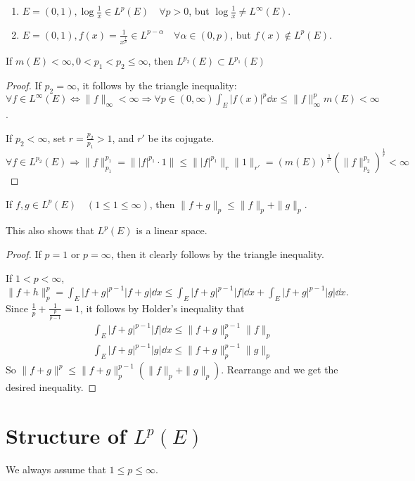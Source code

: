 \documentclass{article}
\begin{document}
\begin{Eg}
\begin{enumerate}
\item$E=(0,1), \log{\frac 1 x}\in L^p(E)\quad \forall p>0$, but $\log{\frac 1 x}\neq L^\infty(E)$.
\item$E=(0,1), f(x)=\frac{1}{x^{\frac 1 p}}\in L^{p-\alpha}\quad\forall\alpha\in (0,p)$, but $f(x)\not\in L^p(E)$.
\end{enumerate}
\end{Eg}

\begin{Prop}
If $m(E)<\infty,0<p_1<p_2\leq\infty$, then $L^{p_2}(E)\subset L^{p_1}(E)$
\end{Prop}

\begin{proof}
If $p_2=\infty$, it follows by the triangle inequality: $\forall f\in L^\infty(E)\Leftrightarrow \|f\|_\infty<\infty\Rightarrow \forall p\in(0,\infty)\int_E|f(x)|^p\dd x\leq \|f\|^p_\infty m(E)<\infty$.

If $p_2<\infty$, set $r=\frac{p_2}{p_1}>1$, and $r'$ be its cojugate. $\forall f\in L^{p_2}(E)\Rightarrow\|f\|_{p_1}^{p_1}=\||f|^{p_1}\cdot 1\|\leq \||f|^{p_1}\|_r\|1\|_{r'}=(m(E))^{\frac 1 {r'}}(\|f\|_{p_2}^{p_2})^{\frac 1 r}<\infty$
\end{proof}

\begin{Thm}
If $f,g\in L^p(E)\quad(1\leq 1\leq \infty)$, then $\|f+g\|_p\leq \|f\|_p+\|g\|_p$.
\end{Thm}

This also shows that $L^p(E)$ is a linear space.

\begin{proof}
If $p=1$ or $p=\infty$, then it clearly follows by the triangle inequality.

If $1<p<\infty$, $\|f+h\|_p^p=\int_E|f+g|^{p-1}|f+g|\dd x\leq \int_E |f+g|^{p-1}|f|\dd x+\int_E|f+g|^{p-1}|g|\dd x$. Since $\frac 1 p+\frac {1}{\frac{p}{p-1}}=1$, it follows by Holder's inequality that 
\begin{gather*}
\int_E|f+g|^{p-1}|f|\dd x\leq \|f+g\|_p^{p-1}\|f\|_p\\
\int_E|f+g|^{p-1}|g|\dd x\leq \|f+g\|_p^{p-1}\|g\|_p
\end{gather*}
So $\|f+g\|^p\leq \|f+g\|_p^{p-1}(\|f\|_p+\|g\|_p)$. Rearrange and we get the desired inequality.
\end{proof}

\section{Structure of $L^p(E)$}
We always assume that $1\leq p\leq \infty$.
\end{document}
